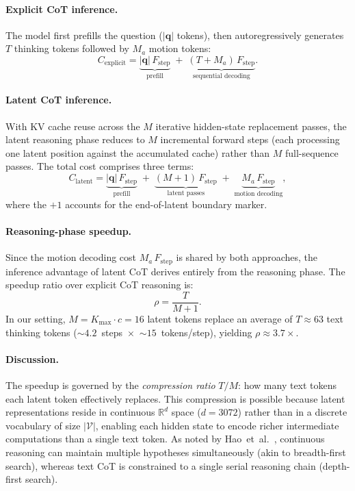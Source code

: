 \paragraph{Explicit CoT inference.}
The model first prefills the question ($|\mathbf{q}|$ tokens), then
autoregressively generates $T$ thinking tokens followed by $M_a$ motion
tokens:
%
\begin{equation}
  C_{\mathrm{explicit}}
  = \underbrace{|\mathbf{q}|\,F_{\mathrm{step}}}_{\text{prefill}}
  \;+\;
  \underbrace{(T + M_a)\,F_{\mathrm{step}}}_{\text{sequential decoding}}.
  \label{eq:cost_explicit}
\end{equation}

\paragraph{Latent CoT inference.}
With KV cache reuse across the $M$ iterative hidden-state replacement
passes, the latent reasoning phase reduces to $M$ incremental forward
steps (each processing one latent position against the accumulated
cache) rather than $M$ full-sequence passes.
The total cost comprises three terms:
%
\begin{equation}
  C_{\mathrm{latent}}
  = \underbrace{|\mathbf{q}|\,F_{\mathrm{step}}}_{\text{prefill}}
  \;+\;
  \underbrace{(M + 1)\,F_{\mathrm{step}}}_{\text{latent passes}}
  \;+\;
  \underbrace{M_a\,F_{\mathrm{step}}}_{\text{motion decoding}},
  \label{eq:cost_latent}
\end{equation}
%
where the $+1$ accounts for the end-of-latent boundary marker.

\paragraph{Reasoning-phase speedup.}
Since the motion decoding cost $M_a\,F_{\mathrm{step}}$ is shared by both
approaches, the inference advantage of latent CoT derives entirely from
the reasoning phase.
The speedup ratio over explicit CoT reasoning is:
%
\begin{equation}
  \rho = \frac{T}{M + 1}.
  \label{eq:speedup}
\end{equation}
%
In our setting, $M{=}K_{\max}{\cdot}c{=}16$ latent tokens replace an
average of $T{\approx}63$ text thinking tokens
(${\sim}4.2$~steps~$\times$~${\sim}15$~tokens/step), yielding
$\rho{\approx}3.7{\times}$.

\paragraph{Discussion.}
The speedup is governed by the \emph{compression ratio} $T/M$: how many
text tokens each latent token effectively replaces.
This compression is possible because latent representations reside in
continuous $\mathbb{R}^d$ space ($d{=}3072$) rather than in a discrete
vocabulary of size $|\mathcal{V}|$, enabling each hidden state to encode
richer intermediate computations than a single text token.
As noted by Hao~et~al.~\cite{hao2024training}, continuous reasoning can
maintain multiple hypotheses simultaneously (akin to breadth-first
search), whereas text CoT is constrained to a single serial reasoning
chain (depth-first search).

